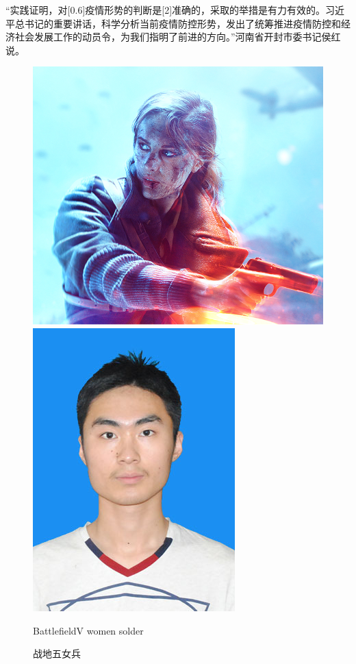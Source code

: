 “实践证明，对\scalebox{1}[0.6]{疫情形势}的判断是\scalebox{1}[2]{准确的}，采取的举措是有力有效的。习近平总书记的重要讲话，科学分析当前疫情防控形势，发出了统筹推进疫情防控和经济社会发展工作的动员令，为我们指明了前进的方向。”河南省开封市委书记侯红说。
	\begin{figure}[h]%
		\centering
		\includegraphics[scale=0.3]{graphic/BFVcover.png}
		\qquad
		\includegraphics[scale=0.9]{graphic/DSC_0043.jpg}
		\renewcommand{\figurename}{Fig} %
		\caption{BattlefieldV women solder}
		\addtocounter{table}{-1} %
		\renewcommand{\figurename}{图} %
		\caption{战地五女兵}
		\label{fig:BFVcover}
	\end{figure}


